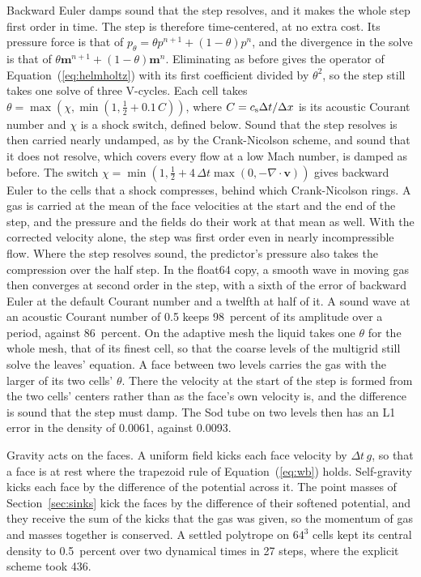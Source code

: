 \documentclass[twocolumn]{aastex701}
\begin{document}
Backward Euler damps sound that the step resolves, and it makes the whole step first order in time. The step is therefore time-centered, at no extra cost. Its pressure force is that of $p_\theta = \theta p^{n+1} + (1-\theta)p^n$, and the divergence in the solve is that of $\theta\mathbf{m}^{n+1} + (1-\theta)\mathbf{m}^n$. Eliminating as before gives the operator of Equation~(\ref{eq:helmholtz}) with its first coefficient divided by $\theta^2$, so the step still takes one solve of three V-cycles. Each cell takes $\theta = \max(\chi, \min(1, \tfrac12 + 0.1\,C))$, where $C = c_{\rm s}\Delta t/\Delta x$ is its acoustic Courant number and $\chi$ is a shock switch, defined below. Sound that the step resolves is then carried nearly undamped, as by the Crank-Nicolson scheme, and sound that it does not resolve, which covers every flow at a low Mach number, is damped as before. The switch $\chi = \min(1, \tfrac12 + 4\,\Delta t\max(0, -\nabla\cdot\mathbf{v}))$ gives backward Euler to the cells that a shock compresses, behind which Crank-Nicolson rings. A gas is carried at the mean of the face velocities at the start and the end of the step, and the pressure and the fields do their work at that mean as well. With the corrected velocity alone, the step was first order even in nearly incompressible flow. Where the step resolves sound, the predictor's pressure also takes the compression over the half step. In the float64 copy, a smooth wave in moving gas then converges at second order in the step, with a sixth of the error of backward Euler at the default Courant number and a twelfth at half of it. A sound wave at an acoustic Courant number of 0.5 keeps 98~percent of its amplitude over a period, against 86~percent. On the adaptive mesh the liquid takes one $\theta$ for the whole mesh, that of its finest cell, so that the coarse levels of the multigrid still solve the leaves' equation. A face between two levels carries the gas with the larger of its two cells' $\theta$. There the velocity at the start of the step is formed from the two cells' centers rather than as the face's own velocity is, and the difference is sound that the step must damp. The Sod tube on two levels then has an L1 error in the density of 0.0061, against 0.0093.

Gravity acts on the faces. A uniform field kicks each face velocity by $\Delta t\,g$, so that a face is at rest where the trapezoid rule of Equation~(\ref{eq:wb}) holds. Self-gravity kicks each face by the difference of the potential across it. The point masses of Section~\ref{sec:sinks} kick the faces by the difference of their softened potential, and they receive the sum of the kicks that the gas was given, so the momentum of gas and masses together is conserved. A settled polytrope on $64^3$ cells kept its central density to 0.5~percent over two dynamical times in 27 steps, where the explicit scheme took 436.
\end{document}
